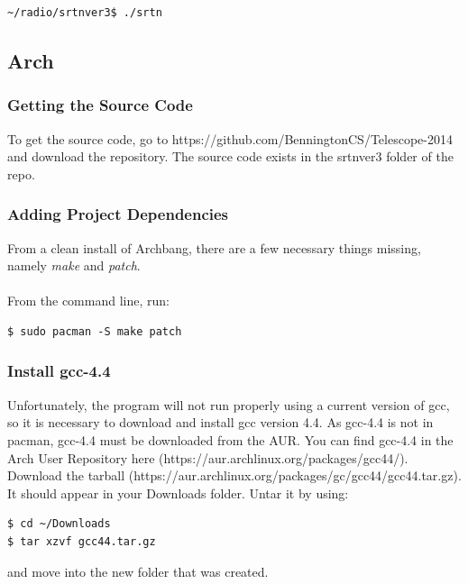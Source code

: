 \documentclass[11pt]{article} %
\begin{document}
\begin{lstlisting}[frame=single]
~/radio/srtnver3$ ./srtn
\end{lstlisting}



\vspace{1cm}
\subsection{Arch}


\subsubsection{Getting the Source Code}
To get the source code, go to https://github.com/BenningtonCS/Telescope-2014 and download the repository. The source code exists in the srtnver3 folder of the repo.

\vspace{1cm}
\subsubsection{Adding Project Dependencies}
From a clean install of Archbang, there are a few necessary things missing, namely \emph{make} and \emph{patch}.
\\ \\
From the command line, run:

\begin{lstlisting}[frame=single]
$ sudo pacman -S make patch
\end{lstlisting}
\vspace{1cm}
\subsubsection{Install gcc-4.4}
Unfortunately, the program will not run properly using a current version of gcc, so it is necessary to download and install gcc version 4.4. As gcc-4.4 is not in pacman, gcc-4.4 must be downloaded from the AUR. You can find gcc-4.4 in the Arch User Repository here (https://aur.archlinux.org/packages/gcc44/). Download the tarball (https://aur.archlinux.org/packages/gc/gcc44/gcc44.tar.gz). It should appear in your Downloads folder. Untar it by using:

\begin{lstlisting}[frame=single]
$ cd ~/Downloads
$ tar xzvf gcc44.tar.gz
\end{lstlisting}

and move into the new folder that was created.
\end{document}
